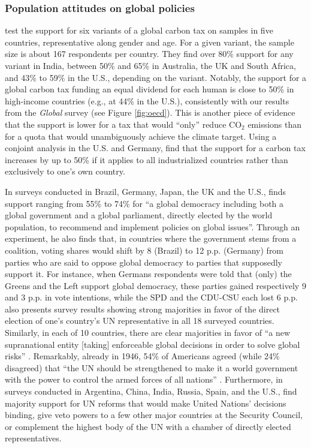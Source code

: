 \documentclass[12pt,english]{article}
\begin{document}
\subsubsection{Population attitudes on global policies}\label{subsubsec:literature_attitudes_policies}
\citet{carattini_how_2019} test the support for six variants of a global carbon tax on samples in five countries, representative along gender and age. For a given variant, the sample size is about 167 respondents per country. They find over 80\% support for any variant in India, between 50\% and 65\% in Australia, the UK and South Africa, and 43\% to 59\% in the U.S., depending on the variant. Notably, the support for a global carbon tax funding an equal dividend for each human is close to 50\% in high-income countries (e.g., at 44\% in the U.S.), consistently with our results from the \textit{Global} survey (see Figure \ref{fig:oecd}). This is another piece of evidence that the support is lower for a tax that would ``only'' reduce CO$_\text{2}$ emissions than for a quota that would unambiguously achieve the climate target. %
Using a conjoint analysis in the U.S. and Germany, \citet{beiser-mcgrath_could_2019} find that the support for a carbon tax increases by up to 50\% %
if it applies to all industrialized countries rather than exclusively to one's own country. %

In surveys conducted in Brazil, Germany, Japan, the UK and the U.S., \citet{ghassim_who_2020} finds support ranging from 55\% to 74\% for ``a global democracy including both a global government and a global parliament, directly elected by the world population, to recommend and implement policies on global issues''. %
Through an experiment, he also finds that, in countries where the government stems from a coalition, voting shares would shift by 8 (Brazil) to 12 p.p. (Germany) from parties who are said to oppose global democracy to parties that supposedly support it. For instance, when Germans respondents were told that (only) the Greens and the Left support global democracy, these parties gained respectively 9 and 3 p.p. in vote intentions, while the SPD and the CDU-CSU each lost 6 p.p. 
\citet{ghassim_who_2020} also presents survey results showing strong majorities in favor of the direct election of one's country's UN representative in all 18 surveyed countries. %
Similarly, in each of 10 countries, there are clear majorities in favor of ``a new supranational entity [taking] enforceable global decisions in order to solve global risks'' \citep{global_challenges_foundation_attitudes_2018}. Remarkably, already in 1946, 54\% of Americans agreed (while 24\% disagreed) that ``the UN should be strengthened to make it a world government with the power to control the armed forces of all nations'' \citep{gallup_seventy_1946}. 
Furthermore, in surveys conducted in Argentina, China, India, Russia, Spain, and the U.S., \citet{ghassim_public_2022} find majority support for UN reforms that would make United Nations' decisions binding, give veto powers to a few other major countries at the Security Council, or complement the highest body of the UN with a chamber of directly elected representatives. 
\end{document}
